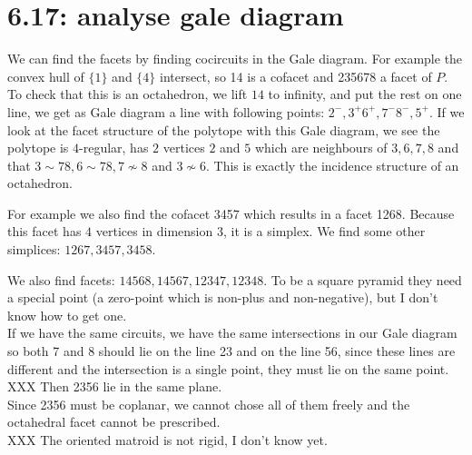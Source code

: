 \documentclass[paper=a4, fontsize=11pt]{scrartcl} %
\theoremstyle{plain}
\begin{document}
 
\section{6.17: analyse gale diagram}
We can find the facets by finding cocircuits in the Gale diagram. For example the convex hull of $\{1\}$ and $\{4\}$ intersect, so 14 is a cofacet and 235678 a facet of $P$. To check that this is an octahedron, we lift $14$ to infinity, and put the rest on one line, we get as Gale diagram a line with following points: $2^-,3^+6^+,7^-8^-,5^+$. If we look at the facet structure of the polytope with this Gale diagram, we see the polytope is $4$-regular, has $2$ vertices $2$ and $5$ which are neighbours of $3,6,7,8$ and that $3\sim 78,6\sim 78, 7\not\sim 8$ and $3\not\sim 6$. This is exactly the incidence structure of an octahedron.

For example we also find the cofacet 3457 which results in a facet 1268. Because this facet has $4$ vertices in dimension $3$, it is a simplex. We find some other simplices: $1267,3457,3458$.

We also find facets: $14568,14567,12347,12348$. To be a square pyramid they need a special point (a zero-point which is non-plus and non-negative), but I don't know how to get one.\\

If we have the same circuits, we have the same intersections in our Gale diagram so both 7 and 8 should lie on the line 23 and on the line 56, since these lines are different and the intersection is a single point, they must lie on the same point.\\

XXX Then 2356 lie in the same plane.\\

Since 2356 must be coplanar, we cannot chose all of them freely and the octahedral facet cannot be prescribed.\\

XXX The oriented matroid is not rigid, I don't know yet.
\end{document}
